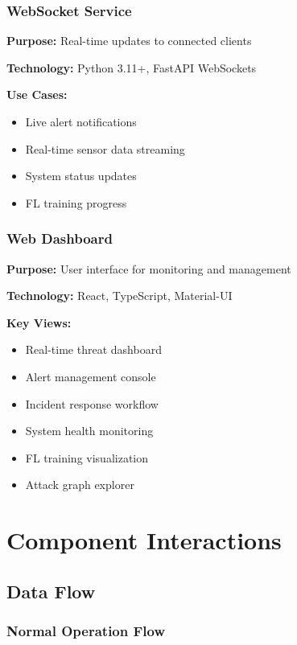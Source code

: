 \documentclass[12pt,a4paper]{article}
\begin{document}
\subsubsection{WebSocket Service}

\textbf{Purpose:} Real-time updates to connected clients

\textbf{Technology:} Python 3.11+, FastAPI WebSockets

\textbf{Use Cases:}
\begin{itemize}[leftmargin=1cm,itemsep=0pt]
    \item Live alert notifications
    \item Real-time sensor data streaming
    \item System status updates
    \item FL training progress
\end{itemize}

\subsubsection{Web Dashboard}

\textbf{Purpose:} User interface for monitoring and management

\textbf{Technology:} React, TypeScript, Material-UI

\textbf{Key Views:}
\begin{itemize}[leftmargin=1cm,itemsep=0pt]
    \item Real-time threat dashboard
    \item Alert management console
    \item Incident response workflow
    \item System health monitoring
    \item FL training visualization
    \item Attack graph explorer
\end{itemize}

\section{Component Interactions}

\subsection{Data Flow}

\subsubsection{Normal Operation Flow}
\end{document}
